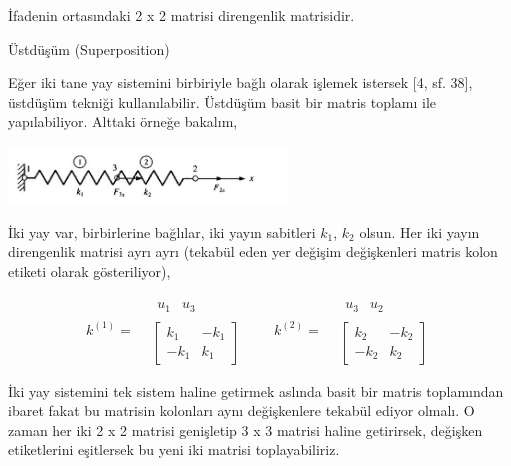 \documentclass[12pt,fleqn]{article}\usepackage{../../common}
\begin{document}
İfadenin ortasındaki 2 x 2 matrisi direngenlik matrisidir.

Üstdüşüm (Superposition)

Eğer iki tane yay sistemini birbiriyle bağlı olarak işlemek istersek [4, sf. 38],
üstdüşüm tekniği kullanılabilir. Üstdüşüm basit bir matris toplamı ile
yapılabiliyor. Alttaki örneğe bakalım,

\includegraphics[width=20em]{phy_020_strs_06_02.jpg}

İki yay var, birbirlerine bağlılar, iki yayın sabitleri $k_1$, $k_2$
olsun. Her iki yayın direngenlik matrisi ayrı ayrı (tekabül eden yer değişim
değişkenleri matris kolon etiketi olarak gösteriliyor),

$$
k^{(1)} =
\begin{array}{cc} & \begin{array}{cc} u_1 & u_3 \end{array} \\ &
\left[
\begin{array}{cc}
k_1 & -k_1 \\ -k_1 & k_1
\end{array}
\right]
\end{array} 
\qquad
k^{(2)} =
\begin{array}{cc} & \begin{array}{cc} u_3 & u_2 \end{array} \\ &
\left[
\begin{array}{cc}
k_2 & -k_2 \\ -k_2 & k_2
\end{array}
\right]
\end{array}
$$

İki yay sistemini tek sistem haline getirmek aslında basit bir matris
toplamından ibaret fakat bu matrisin kolonları aynı değişkenlere tekabül ediyor
olmalı. O zaman her iki 2 x 2 matrisi genişletip 3 x 3 matrisi haline
getirirsek, değişken etiketlerini eşitlersek bu yeni iki matrisi
toplayabiliriz.
\end{document}
